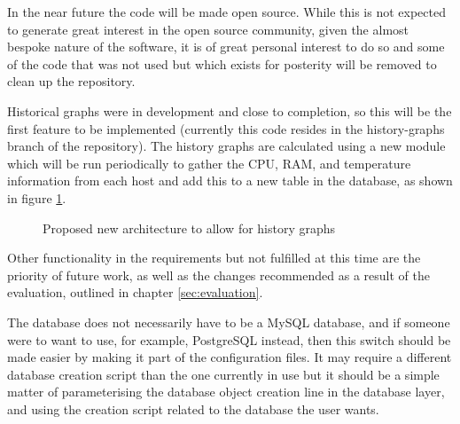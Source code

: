 \label{sec:future}
In the near future the code will be made open source.
While this is not expected to generate great interest in the open source community, given the almost bespoke nature of the software, it is of great personal interest to do so and some of the code that was not used but which exists for posterity will be removed to clean up the repository.

Historical graphs were in development and close to completion, so this will be the first feature to be implemented (currently this code resides in the history-graphs branch of the repository).
The history graphs are calculated using a new module which will be run periodically to gather the CPU, RAM, and temperature information from each host and add this to a new table in the database, as shown in figure \ref{fig:newArch}.

\begin{figure}[t]
	\centering
	\setlength\fboxsep{0pt}
	\setlength\fboxrule{0pt}
	\caption{Proposed new architecture to allow for history graphs}
	\label{fig:newArch}
\end{figure}

Other functionality in the requirements but not fulfilled at this time are the priority of future work, as well as the changes recommended as a result of the evaluation, outlined in chapter \ref{sec:evaluation}.

The database does not necessarily have to be a MySQL database, and if someone were to want to use, for example, PostgreSQL instead, then this switch should be made easier by making it part of the configuration files.
It may require a different database creation script than the one currently in use but it should be a simple matter of parameterising the database object creation line in the database layer, and using the creation script related to the database the user wants.